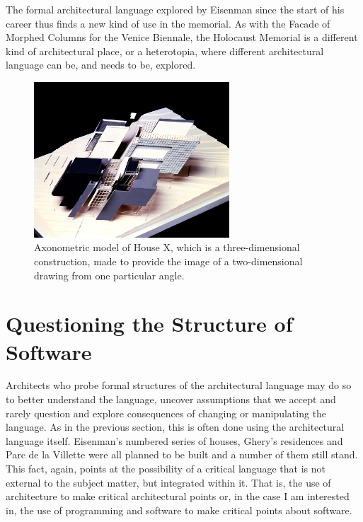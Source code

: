 The formal architectural language explored by Eisenman since the start of his career thus
finds a new kind of use in the memorial. As with the Facade of Morphed Columns for the Venice
Biennale, the Holocaust Memorial is a different kind of architectural place, or a heterotopia,
where different architectural language can be, and needs to be, explored.

%
%

\begin{figure}
\centering
\vspace{-1em}
\includegraphics[width=0.65\textwidth]{chapters/fig/axonometric.jpg}\quad
\caption{Axonometric model of House X, which is a three-dimensional construction,
made to provide the image of a two-dimensional drawing from one particular angle.}
\label{fig:axonometric}
\end{figure}

\section{Questioning the Structure of Software}
Architects who probe formal structures of the architectural language may do so to better understand
the language, uncover assumptions that we accept and rarely question and explore consequences of
changing or manipulating the language. As in the previous section, this is often done using the
architectural language itself. Eisenman's numbered series of houses, Ghery's residences and Parc
de la Villette were all planned to be built and a number of them still stand.
This fact, again, points at the possibility of a critical language that is not external to the subject
matter, but integrated within it. That is, the use of architecture to make critical architectural points
or, in the case I am interested in, the use of programming and software to make critical points about
software.

